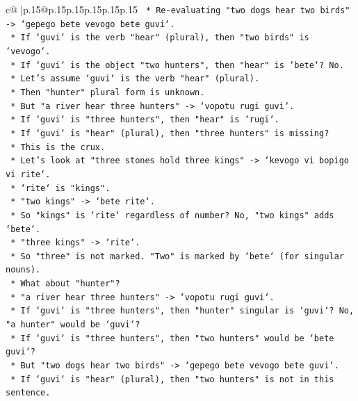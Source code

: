 \documentclass{article}
\begin{document}
{\begin{supertabular}{c@{$\;$}|p{.15\linewidth}@{}p{.15\linewidth}p{.15\linewidth}p{.15\linewidth}p{.15\linewidth}p{.15\linewidth}}
{{{\texttt{            *   Re{-}evaluating "two dogs hear two birds" {-}> `gepego bete vevogo bete guvi`.} \\
\texttt{                *   If `guvi` is the verb "hear" (plural), then "two birds" is `vevogo`.} \\
\texttt{                *   If `guvi` is the object "two hunters", then "hear" is `bete`? No.} \\
\texttt{                *   Let's assume `guvi` is the verb "hear" (plural).} \\
\texttt{                *   Then "hunter" plural form is unknown.} \\
\texttt{                *   But "a river hear three hunters" {-}> `vopotu rugi guvi`.} \\
\texttt{                *   If `guvi` is "three hunters", then "hear" is `rugi`.} \\
\texttt{                *   If `guvi` is "hear" (plural), then "three hunters" is missing?} \\
\texttt{                *   This is the crux.} \\
\texttt{                *   Let's look at "three stones hold three kings" {-}> `kevogo vi bopigo vi rite`.} \\
\texttt{                *   `rite` is "kings".} \\
\texttt{                *   "two kings" {-}> `bete rite`.} \\
\texttt{                *   So "kings" is `rite` regardless of number? No, "two kings" adds `bete`.} \\
\texttt{                *   "three kings" {-}> `rite`.} \\
\texttt{                *   So "three" is not marked. "Two" is marked by `bete` (for singular nouns).} \\
\texttt{                *   What about "hunter"?} \\
\texttt{                *   "a river hear three hunters" {-}> `vopotu rugi guvi`.} \\
\texttt{                *   If `guvi` is "three hunters", then "hunter" singular is `guvi`? No, "a hunter" would be `guvi`?} \\
\texttt{                *   If `guvi` is "three hunters", then "two hunters" would be `bete guvi`?} \\
\texttt{                *   But "two dogs hear two birds" {-}> `gepego bete vevogo bete guvi`.} \\
\texttt{                *   If `guvi` is "hear" (plural), then "two hunters" is not in this sentence.} \\
}}}
\end{supertabular}}
\end{document}
